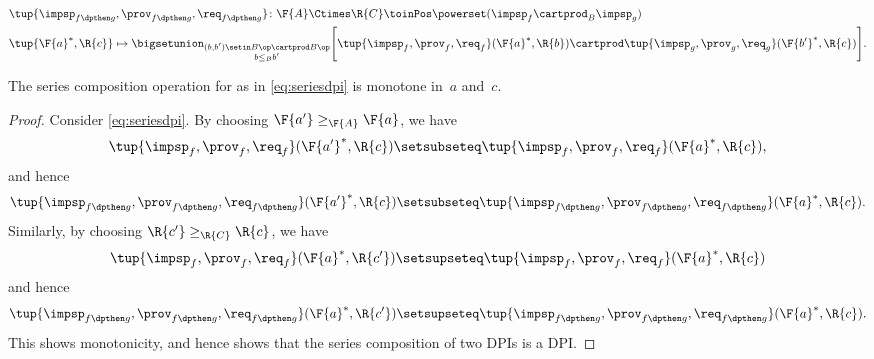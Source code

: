\begin{definition}
\begin{widepar}
        \begin{equation}
            \label{eq:seriesdpi}
            \begin{aligned}
                 & \tup{\impsp_{f\dpthen g},\prov_{f\dpthen g},\req_{f\dpthen g}}\colon \F{A}\Ctimes \R{C} \toinPos \powerset(\impsp_f \cartprod_B \impsp_g) \\
                 & \tup{\F{a}^*,\R{c}} \mapsto \bigsetunion_{\substack{(b,b') \setin B\op \cartprod B\op \\ b \leq_B b'}} \Bigg[ \tup{\impsp_f,\prov_f,\req_f}(\F{a}^*,\R{b}) \cartprod \tup{\impsp_g,\prov_g,\req_g}(\F{b'}^*,\R{c}) \Bigg].
            \end{aligned}
        \end{equation}
    \end{widepar}
\end{definition}

\begin{lemma}
    \label{lem:series-dp}
    The series composition operation for  as in \cref{eq:seriesdpi} is monotone in~$a$ and~$c$.
\end{lemma}
\begin{proof}
    Consider \cref{eq:seriesdpi}.
    By choosing $\F{a'}\geq_\F{A} \F{a}$, we have
    \begin{equation}
        \tup{\impsp_{f},\prov_{f},\req_{f}}(\F{a'}^*,\R{c})\setsubseteq \tup{\impsp_{f},\prov_{f},\req_{f}}(\F{a}^*,\R{c}),
    \end{equation}
    and hence
    \begin{equation}
        \tup{\impsp_{f\dpthen g},\prov_{f\dpthen g},\req_{f\dpthen g}}(\F{a'}^*,\R{c})\setsubseteq \tup{\impsp_{f\dpthen g},\prov_{f\dpthen g},\req_{f\dpthen g}}(\F{a}^*,\R{c}).
    \end{equation}
    Similarly, by choosing $\R{c'}\geq_{\R{C}} \R{c}$, we have
    \begin{equation}
        \tup{\impsp_{f},\prov_{f},\req_{f}}(\F{a}^*,\R{c'})\setsupseteq \tup{\impsp_{f},\prov_{f},\req_{f}}(\F{a}^*,\R{c})
    \end{equation}
    and hence
    \begin{equation}
        \tup{\impsp_{f\dpthen g},\prov_{f\dpthen g},\req_{f\dpthen g}}(\F{a}^*,\R{c'})\setsupseteq \tup{\impsp_{f\dpthen g},\prov_{f\dpthen g},\req_{f\dpthen g}}(\F{a}^*,\R{c}).
    \end{equation}
    This shows monotonicity, and hence shows that the series composition of two DPIs is a DPI.
\end{proof}

